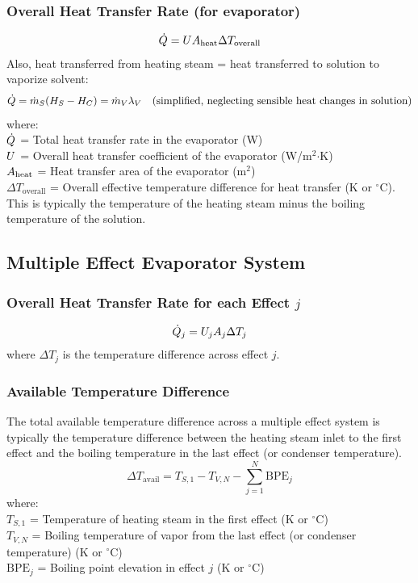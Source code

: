 \subsubsection*{Overall Heat Transfer Rate (for evaporator)}
\begin{equation}
    \dot{Q} = U A_{\text{heat}} \Delta T_{\text{overall}}
\end{equation}
Also, heat transferred from heating steam = heat transferred to solution to vaporize solvent:
\begin{equation}
    \dot{Q} = \dot{m}_S (H_S - H_C) = \dot{m}_V \lambda_V \quad \text{(simplified, neglecting sensible heat changes in solution)}
\end{equation}
where: \\
$\dot{Q}$ = Total heat transfer rate in the evaporator (W) \\
$U$ = Overall heat transfer coefficient of the evaporator (W/m$^2$$\cdot$K) \\
$A_{\text{heat}}$ = Heat transfer area of the evaporator (m$^2$) \\
$\Delta T_{\text{overall}}$ = Overall effective temperature difference for heat transfer (K or $^\circ$C). This is typically the temperature of the heating steam minus the boiling temperature of the solution.

\subsection{Multiple Effect Evaporator System}
\subsubsection*{Overall Heat Transfer Rate for each Effect $j$}
\begin{equation}
    \dot{Q}_j = U_j A_j \Delta T_j
\end{equation}
where $\Delta T_j$ is the temperature difference across effect $j$.

\subsubsection*{Available Temperature Difference}
The total available temperature difference across a multiple effect system is typically the temperature difference between the heating steam inlet to the first effect and the boiling temperature in the last effect (or condenser temperature).
\begin{equation}
    \Delta T_{\text{avail}} = T_{S,1} - T_{V,N} - \sum_{j=1}^{N} \text{BPE}_j
\end{equation}
where: \\
$T_{S,1}$ = Temperature of heating steam in the first effect (K or $^\circ$C) \\
$T_{V,N}$ = Boiling temperature of vapor from the last effect (or condenser temperature) (K or $^\circ$C) \\
$\text{BPE}_j$ = Boiling point elevation in effect $j$ (K or $^\circ$C)

